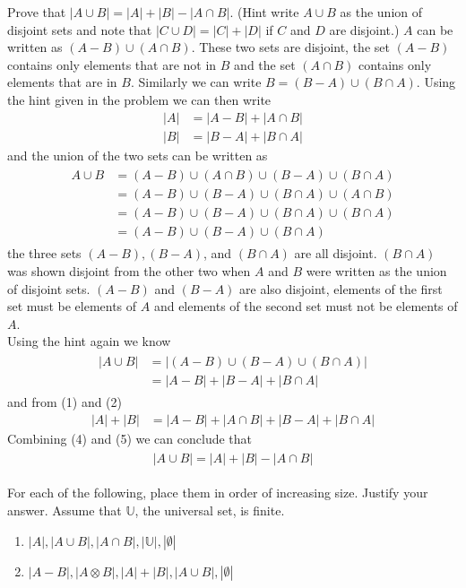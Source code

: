 \documentclass[paper=a4, fontsize=11pt]{jhwhw} %
\begin{document}
\problem{}
Prove that $|A\cup B| = |A| + |B| - |A\cap B|$. (Hint write $A\cup B$ as the union of disjoint sets and note that $|C\cup D| = |C| + |D|$ if $C$ and $D$ are disjoint.)
\solution
$A$ can be written as $(A-B)\cup (A\cap B)$. These two sets are disjoint, the set $(A-B)$ contains only elements that are not in $B$ and the set $(A\cap B)$ contains only elements that are in $B$. Similarly we can write $B = (B-A)\cup (B\cap A)$. Using the hint given in the problem we can then write
\begin{align}
|A| &= |A-B| + |A\cap B|\\
|B| &= |B-A| + |B\cap A|
\end{align}
and the union of the two sets can be written as
\begin{align}
\begin{split}
A\cup B &= (A-B)\cup (A\cap B)\cup (B-A)\cup (B\cap A)\\
&= (A-B)\cup (B-A)\cup (B\cap A)\cup (A\cap B)\\
&= (A-B)\cup (B-A)\cup (B\cap A)\cup (B\cap A)\\
&= (A-B)\cup (B-A)\cup (B\cap A)
\end{split}
\end{align}
the three sets $(A-B), (B-A)$, and $(B\cap A)$ are all disjoint. $(B\cap A)$ was shown disjoint from the other two when $A$ and $B$ were written as the union of disjoint sets. $(A-B)$ and $(B-A)$ are also disjoint, elements of the first set must  be elements of $A$ and elements of the second set must not be elements of $A$.\\

Using the hint again we know
\begin{align}
\begin{split}
|A\cup B| &= |(A-B)\cup (B-A)\cup (B\cap A)|\\
&= |A-B| + |B-A| + |B\cap A|
\end{split}
\end{align}
and from (1) and (2)
\begin{align}
|A| + |B| &= |A-B| + |A\cap B| + |B-A| + |B\cap A|
\end{align}
Combining (4) and (5) we can conclude that
\begin{align}
\begin{split}
|A\cup B| = |A| + |B| - |A\cap B|
\end{split}
\end{align}

\problem{}
For each of the following, place them in order of increasing size. Justify your answer. Assume that $\mathbb{U}$, the universal set, is finite.
\begin{enumerate}
\item $|A|, |A\cup B|, |A\cap B|, |\mathbb{U}|, |\emptyset|$
\item $|A - B|, |A\otimes B|, |A| + |B|, |A\cup B|, |\emptyset|$
\end{enumerate}
\end{document}
